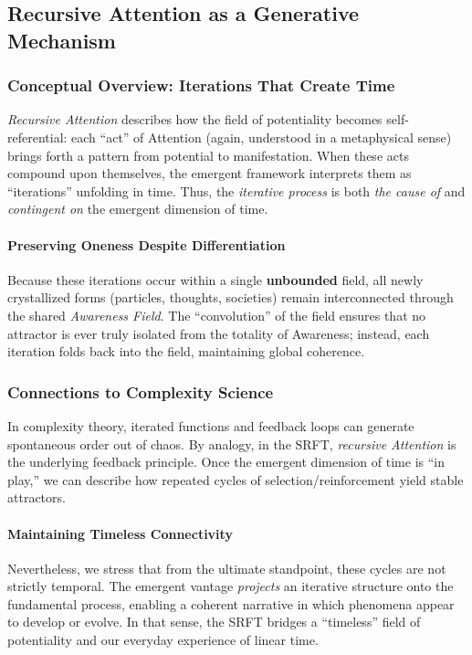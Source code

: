 \documentclass[12pt,a4paper]{article}
\begin{document}
\subsection{Recursive Attention as a Generative Mechanism}
\label{subsec:recursive-attention}

\subsubsection{Conceptual Overview: Iterations That Create Time}
\emph{Recursive Attention} describes how the field of potentiality becomes self-referential: each ``act'' of Attention (again, understood in a metaphysical sense) brings forth a pattern from potential to manifestation. When these acts compound upon themselves, the emergent framework interprets them as ``iterations'' unfolding in time. Thus, the \emph{iterative process} is both \emph{the cause of} and \emph{contingent on} the emergent dimension of time.

\paragraph{Preserving Oneness Despite Differentiation}
Because these iterations occur within a single \textbf{unbounded} field, all newly crystallized forms (particles, thoughts, societies) remain interconnected through the shared \emph{Awareness Field}. The “convolution” of the field ensures that no attractor is ever truly isolated from the totality of Awareness; instead, each iteration folds back into the field, maintaining global coherence.

\subsubsection{Connections to Complexity Science}
\label{subsubsec:complexity-feedback}
In complexity theory, iterated functions and feedback loops can generate spontaneous order out of chaos. By analogy, in the SRFT, \emph{recursive Attention} is the underlying feedback principle. Once the emergent dimension of time is “in play,” we can describe how repeated cycles of selection/reinforcement yield stable attractors.

\paragraph{Maintaining Timeless Connectivity}
Nevertheless, we stress that from the ultimate standpoint, these cycles are not strictly temporal. The emergent vantage \emph{projects} an iterative structure onto the fundamental process, enabling a coherent narrative in which phenomena appear to develop or evolve. In that sense, the SRFT bridges a “timeless” field of potentiality and our everyday experience of linear time.
\end{document}
